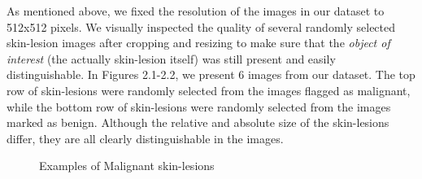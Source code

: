 \documentclass [MAS] {uclathes}
\begin{document}
As mentioned above, we fixed the resolution of the images in our dataset to 512x512 pixels. We visually inspected the quality of several randomly selected skin-lesion images after cropping and resizing to make sure that the \textit{object of interest} (the actually skin-lesion itself) was still present and easily distinguishable. In Figures 2.1-2.2, we present 6 images from our dataset. The top row of skin-lesions were randomly selected from the images flagged as malignant, while the bottom row of skin-lesions were randomly selected from the images marked as benign. Although the relative and absolute size of the skin-lesions differ, they are all clearly distinguishable in the images. 

\begin{figure}[hbt!]
\hspace*{\fill}
\centering
{}\hspace{0.5em}
\hspace{0.5em}
\hspace*{\fill}
\label{fig:mel_examples}
\vspace{-1cm}
\caption{Examples of Malignant skin-lesions}
\end{figure}
\end{document}
